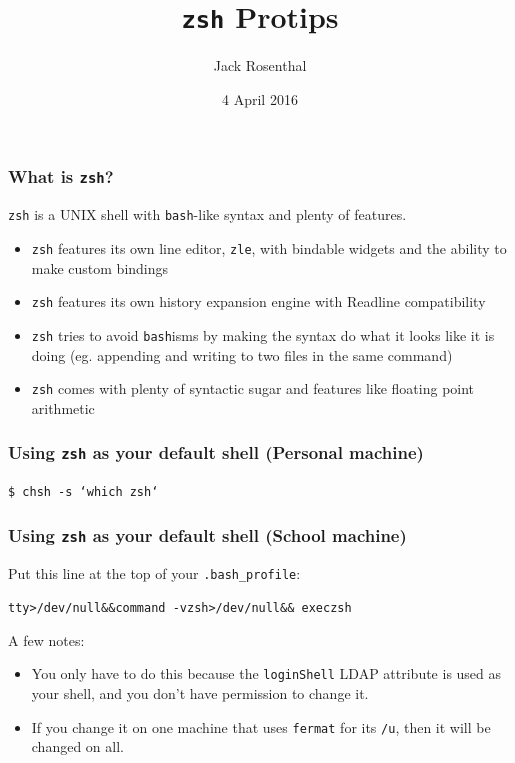 \documentclass{beamer}
\title{\texttt{zsh} Protips}
\author{Jack Rosenthal}
\date{4 April 2016}
\begin{document}
\begin{frame}
    \maketitle
\end{frame}
\logo{}

\begin{frame}
    \frametitle{What is \texttt{zsh}?}
    \texttt{zsh} is a UNIX shell with \texttt{bash}-like syntax and plenty of
    features.
    \pause
    \begin{itemize}[<+->]
        \item \texttt{zsh} features its own line editor, \texttt{zle}, with
            bindable widgets and the ability to make custom bindings
        \item \texttt{zsh} features its own history expansion engine with
            Readline compatibility
        \item \texttt{zsh} tries to avoid \texttt{bash}isms by making the
            syntax do what it looks like it is doing (eg. appending and writing
            to two files in the same command)
        \item \texttt{zsh} comes with plenty of syntactic sugar and features
            like floating point arithmetic
    \end{itemize}
\end{frame}

\begin{frame}
    \frametitle{Using \texttt{zsh} as your default shell (Personal machine)}
    \centering
    \Large
    \texttt{\$ chsh -s `which zsh`}
\end{frame}

\begin{frame}
    \frametitle{Using \texttt{zsh} as your default shell (School machine)}
    Put this line at the top of your \texttt{.bash\_profile}:

    \texttt{tty\hfill>/dev/null\hfill\&\&\hfill command\hfill
    -v\hfill zsh\hfill >/dev/null\hfill \&\&\hfill
    exec\hfill zsh}
    \medskip

    A few notes:
    \begin{itemize}
        \item You only have to do this because the \texttt{loginShell}
            LDAP attribute is used as your shell, and you don't have permission
            to change it.
        \item If you change it on one machine that uses \texttt{fermat} for its
            \texttt{/u}, then it will be changed on all.
    \end{itemize}
\end{frame}
\end{document}
